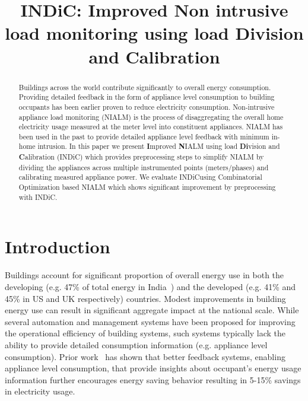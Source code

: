 \documentclass[conference]{IEEEtran}
\newcommand{\indic}{INDiC}
\begin{document}
%
\title{INDiC: Improved Non intrusive load monitoring using load Division and Calibration}


\author{
\and
{}
\and
{}
}
\maketitle


\begin{abstract}
Buildings across the world contribute significantly to overall energy consumption. Providing detailed feedback in the form of appliance level consumption to building occupants has been earlier proven to reduce electricity consumption. Non-intrusive appliance load monitoring (NIALM) is the process of disaggregating the overall home electricity usage measured at the meter level into constituent appliances. NIALM has been used in the past to provide detailed appliance level feedback with minimum in-home intrusion. In this paper we present \textbf{I}mproved \textbf{N}IALM using load \textbf{Di}vision and \textbf{C}alibration (\indic) which provides preprocessing steps to simplify NIALM by dividing the appliances across multiple instrumented points (meters/phases) and calibrating measured appliance power. We evaluate \indic using Combinatorial Optimization based NIALM which shows significant improvement by preprocessing with \indic.
\end{abstract}
\IEEEpeerreviewmaketitle



\section{Introduction}
\noindent Buildings account for significant proportion of overall energy use in both the developing (e.g. 47\% of total energy in India~\cite{evans09}) and the developed (e.g. 41\% and 45\% in US and UK respectively) countries. Modest improvements in building energy use can result in significant aggregate impact at the national scale. While several automation and management systems have been proposed for improving the operational efficiency of building systems, such systems typically lack the ability to provide detailed consumption information (e.g. appliance level consumption). Prior work~\cite{darby} has shown that better feedback systems, enabling appliance level consumption, that provide insights about occupant's energy usage information further encourages energy saving behavior resulting in 5-15\% savings in electricity usage.
\end{document}
